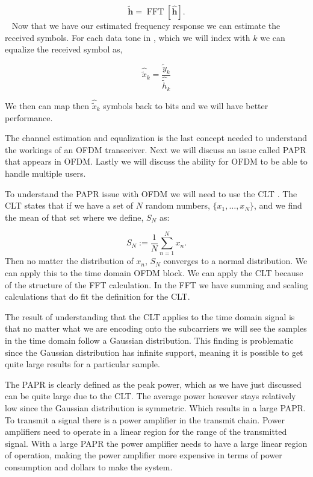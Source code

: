 \begin{equation}
\tilde{\mathbf{h}} = \operatorname{FFT}\left[\hat{\mathbf{h}}\right].
\end{equation}
 
Now that we have our estimated frequency response we can estimate the received symbols. For each data tone in , which we will index with $k$ we can equalize the received symbol as,

\begin{equation}
\hat{\tilde{x}}_k= \frac{\tilde{y}_k}{\hat{\tilde{h}}_k}
\end{equation}

\noindent
We then can map then $\hat{\tilde{x}}_k$ symbols back to bits and we will have better performance.
	
The channel estimation and equalization is the last concept needed to understand the workings of an \ac{OFDM} transceiver. Next we will discuss an issue called \ac{PAPR} that appears in \ac{OFDM}. Lastly we will discuss the ability for \ac{OFDM} to be able to handle multiple users. 

To understand the \ac{PAPR} issue with \ac{OFDM} we will need to use the \ac{CLT} \cite{rosenblatt1956central}. The \ac{CLT} states that if we have a set of $N$ random numbers, $\{x_1, \dots, x_N\}$, and we find the mean of that set where we define, $S_N$ as:

\begin{equation}
S_N := \frac{1}{N}\sum_{n=1}^{N}x_n.
\end{equation}
\noindent
Then no matter the distribution of $x_n$, $S_N$ converges to a normal distribution. We can apply this to the time domain \ac{OFDM} block. We can apply the \ac{CLT} because of the structure of the \ac{FFT} calculation. In the \ac{FFT} we have summing and scaling calculations that do fit the definition for the \ac{CLT}.

The result of understanding that the \ac{CLT} applies to the time domain signal is that no matter what we are encoding onto the subcarriers we will see the samples in the time domain follow a Gaussian distribution. This finding is problematic since the Gaussian distribution has infinite support, meaning it is possible to get quite large results for a particular sample.

The \ac{PAPR} is clearly defined as the peak power, which as we have just discussed can be quite large due to the \ac{CLT}. The average power however stays relatively low since the Gaussian distribution is symmetric. Which results in a large \ac{PAPR}. To transmit a signal there is a power amplifier in the transmit chain. Power amplifiers need to operate in a linear region for the range of the transmitted signal. With a large \ac{PAPR} the power amplifier needs to have a large linear region of operation, making the power amplifier more expensive in terms of power consumption and dollars to make the system.

